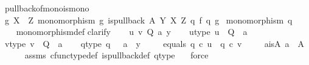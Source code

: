\begin{isabellebody}
\ pullback{\isacharunderscore}{\kern0pt}of{\isacharunderscore}{\kern0pt}mono{\isacharunderscore}{\kern0pt}is{\isacharunderscore}{\kern0pt}mono{}{\isacharcolon}{\kern0pt}\isanewline
{}\ {\isachardoublequoteopen}g{\isacharcolon}{\kern0pt}\ X\ {\isasymrightarrow}\ Z{\isachardoublequoteclose}\ {\isachardoublequoteopen}monomorphism\ g{\isachardoublequoteclose}\ {\isachardoublequoteopen}is{\isacharunderscore}{\kern0pt}pullback\ A\ Y\ X\ Z\ q{}\ f\ q{}\ g{\isachardoublequoteclose}\isanewline
{}\ {\isachardoublequoteopen}monomorphism\ q{}{\isachardoublequoteclose}\ \isanewline
%
\isadelimproof
\ \ %
\endisadelimproof
%
\isatagproof
{}\isamarkupfalse%
\ monomorphism{\isacharunderscore}{\kern0pt}def{}\isanewline
{}\isamarkupfalse%
{\isacharparenleft}{\kern0pt}clarify{\isacharparenright}{\kern0pt}\isanewline
\ \ \isamarkupfalse%
\ u\ v\ Q\ a\ y\isanewline
\ \ \isamarkupfalse%
\ u{\isacharunderscore}{\kern0pt}type{\isacharcolon}{\kern0pt}\ {\isachardoublequoteopen}u\ {\isacharcolon}{\kern0pt}\ Q\ {\isasymrightarrow}\ a{\isachardoublequoteclose}\ \ \isanewline
\ \ \isamarkupfalse%
\ v{\isacharunderscore}{\kern0pt}type{\isacharcolon}{\kern0pt}\ {\isachardoublequoteopen}v\ {\isacharcolon}{\kern0pt}\ Q\ {\isasymrightarrow}\ a{\isachardoublequoteclose}\isanewline
\ \ \isamarkupfalse%
\ q{}{\isacharunderscore}{\kern0pt}type{\isacharcolon}{\kern0pt}\ {\isachardoublequoteopen}q{}\ {\isacharcolon}{\kern0pt}\ \ a\ {\isasymrightarrow}\ y{\isachardoublequoteclose}\ \isanewline
\ \ \isamarkupfalse%
\ equals{\isacharcolon}{\kern0pt}\ {\isachardoublequoteopen}q{}\ {\isasymcirc}\isactrlsub c\ u\ {\isacharequal}{\kern0pt}\ q{}\ {\isasymcirc}\isactrlsub c\ v{\isachardoublequoteclose}\ \isanewline
\isanewline
\ \ \isamarkupfalse%
\ a{\isacharunderscore}{\kern0pt}is{\isacharunderscore}{\kern0pt}A{\isacharcolon}{\kern0pt}\ {\isachardoublequoteopen}a\ {\isacharequal}{\kern0pt}\ A{\isachardoublequoteclose}\isanewline
\ \ \ \ \isamarkupfalse%
\ assms{\isacharparenleft}{\kern0pt}{}{\isacharparenright}{\kern0pt}\ cfunc{\isacharunderscore}{\kern0pt}type{\isacharunderscore}{\kern0pt}def\ is{\isacharunderscore}{\kern0pt}pullback{\isacharunderscore}{\kern0pt}def\ q{}{\isacharunderscore}{\kern0pt}type\ \ \isamarkupfalse%
\ force\isanewline
\ \ \isamarkupfalse%

\end{isabellebody}
